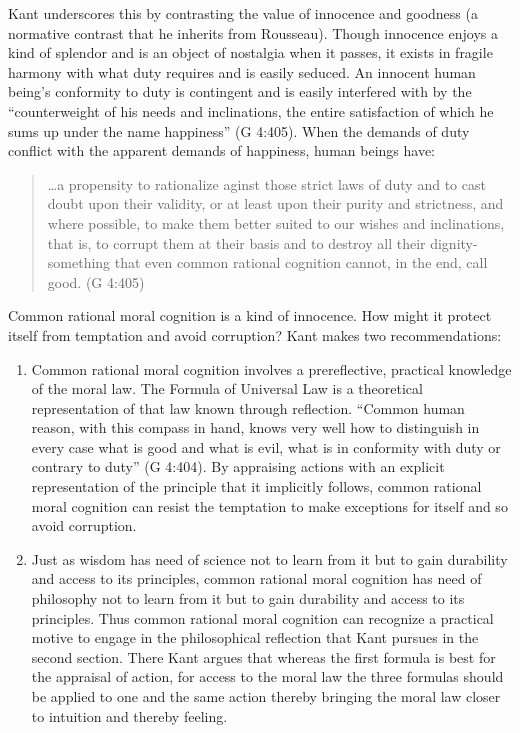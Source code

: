 Kant underscores this by contrasting the value of innocence and goodness (a normative contrast that he inherits from Rousseau). Though innocence enjoys a kind of splendor and is an object of nostalgia when it passes, it exists in fragile harmony with what duty requires and is easily seduced. An innocent human being's conformity to duty is contingent and is easily interfered with by the ``counterweight of his needs and inclinations, the entire satisfaction of which he sums up under the name happiness'' (G 4:405). When the demands of duty conflict with the apparent demands of happiness, human beings have:

\begin{quote}
	\ldots a propensity to rationalize aginst those strict laws of duty and to cast doubt upon their validity, or at least upon their purity and strictness, and where possible, to make them better suited to our wishes and inclinations, that is, to corrupt them at their basis and to destroy all their dignity-something that even common rational cognition cannot, in the end, call good. (G 4:405)
\end{quote}

Common rational moral cognition is a kind of innocence. How might it protect itself from temptation and avoid corruption? Kant makes two recommendations:

\begin{enumerate}
	\item Common rational moral cognition involves a prereflective, practical knowledge of the moral law. The Formula of Universal Law is a theoretical representation of that law known through reflection. ``Common human reason, with this compass in hand, knows very well how to distinguish in every case what is good and what is evil, what is in conformity with duty or contrary to duty'' (G 4:404). By appraising actions with an explicit representation of the principle that it implicitly follows, common rational moral cognition can resist the temptation to make exceptions for itself and so avoid corruption.
	\item Just as wisdom has need of science not to learn from it but to gain durability and access to its principles, common rational moral cognition has need of philosophy not to learn from it but to gain durability and access to its principles. Thus common rational moral cognition can recognize a practical motive to engage in the philosophical reflection that Kant pursues in the second section. There Kant argues that whereas the first formula is best for the appraisal of action, for access to the moral law the three formulas should be applied to one and the same action thereby bringing the moral law closer to intuition and thereby feeling.
\end{enumerate}

